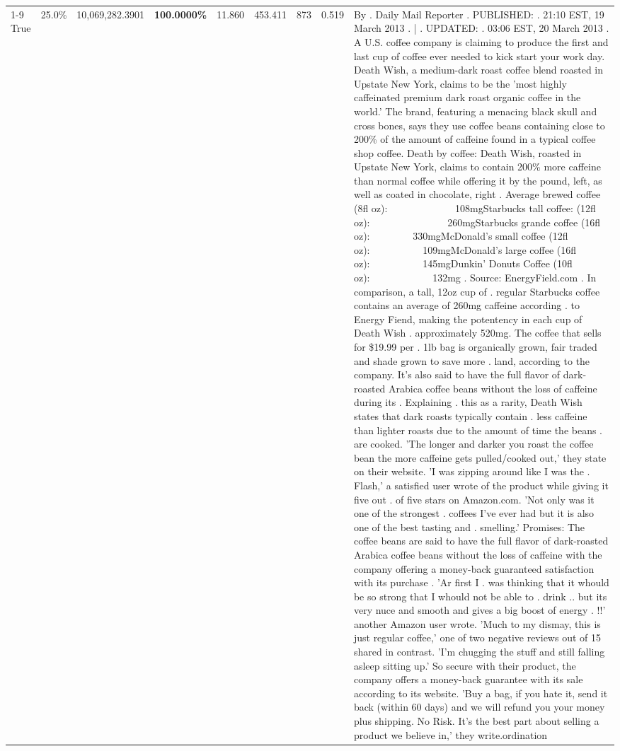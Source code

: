 \begin{table}[H]
{\begin{tabular}{lllrlllll}
\cline{1-9}
True & 25.0\% & 10,069,282.3901 & \bfseries \color{red} 100.0000\% & 11.860 & 453.411 & 873 & 0.519 & By . Daily Mail Reporter . PUBLISHED: . 21:10 EST, 19 March 2013 . | . UPDATED: . 03:06 EST, 20 March 2013 . A U.S. coffee company is claiming to produce the first and last cup of coffee ever needed to kick start your work day. Death Wish, a medium-dark roast coffee blend roasted in Upstate New York, claims to be the 'most highly caffeinated premium dark roast organic coffee in the world.' The brand, featuring a menacing black skull and cross bones, says they use coffee beans containing close to 200\% of the amount of caffeine found in a typical coffee shop coffee. Death by coffee: Death Wish, roasted in Upstate New York, claims to contain 200\% more caffeine than normal coffee while offering it by the pound, left, as well as coated in chocolate, right . Average brewed coffee (8fl oz):              108mgStarbucks tall coffee: (12fl oz):                260mgStarbucks grande coffee (16fl oz):         330mgMcDonald's small coffee (12fl oz):           109mgMcDonald's large coffee (16fl oz):           145mgDunkin' Donuts Coffee (10fl oz):             132mg . Source: EnergyField.com . In comparison, a tall, 12oz cup of . regular Starbucks coffee contains an average of 260mg caffeine according . to Energy Fiend, making the potentency in each cup of Death Wish . approximately 520mg. The coffee that sells for \$19.99 per . 1lb bag is organically grown, fair traded and shade grown to save more . land, according to the company. It's also said to have the full flavor of dark-roasted Arabica coffee beans without the loss of caffeine during its . Explaining . this as a rarity, Death Wish states that dark roasts typically contain . less caffeine than lighter roasts due to the amount of time the beans . are cooked. 'The longer and darker you roast the coffee bean the more caffeine gets pulled/cooked out,' they state on their website. 'I was zipping around like I was the . Flash,' a satisfied user wrote of the product while giving it five out . of five stars on Amazon.com. 'Not only was it one of the strongest . coffees I've ever had but it is also one of the best tasting and . smelling.’ Promises: The coffee beans are said to have the full flavor of dark-roasted Arabica coffee beans without the loss of caffeine with the company offering a money-back guaranteed satisfaction with its purchase . 'Ar first I . was thinking that it whould be so strong that I whould not be able to . drink .. but its very nuce and smooth and gives a big boost of energy . !!' another Amazon user wrote. 'Much to my dismay, this is just regular coffee,' one of two negative reviews out of 15 shared in contrast. 'I'm chugging the stuff and still falling asleep sitting up.' So secure with their product, the company offers a money-back guarantee with its sale according to its website. 'Buy a bag, if you hate it, send it back (within 60 days) and we will refund you your money plus shipping. No Risk. It’s the best part about selling a product we believe in,' they write.ordination \\

\end{tabular}}
\end{table}

